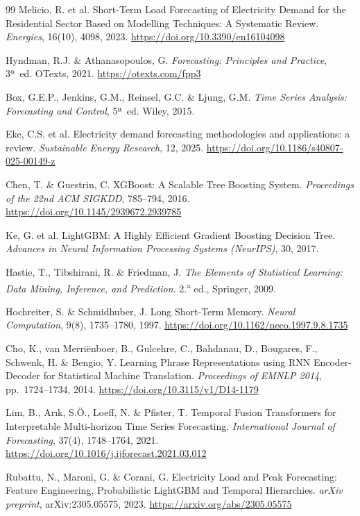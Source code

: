 \documentclass[12pt, a4paper]{article}
\begin{document}
\begin{thebibliography}{99}
Melicio, R. et al. Short-Term Load Forecasting of Electricity Demand for the Residential Sector Based on Modelling Techniques: A Systematic Review. \textit{Energies}, 16(10), 4098, 2023.
\url{https://doi.org/10.3390/en16104098}

Hyndman, R.J. \& Athanasopoulos, G. \textit{Forecasting: Principles and Practice}, 3ª~ed. OTexts, 2021.
\url{https://otexts.com/fpp3}

Box, G.E.P., Jenkins, G.M., Reinsel, G.C. \& Ljung, G.M. \textit{Time Series Analysis: Forecasting and Control}, 5ª~ed. Wiley, 2015.

Eke, C.S. et al. Electricity demand forecasting methodologies and applications: a review. \textit{Sustainable Energy Research}, 12, 2025.
\url{https://doi.org/10.1186/s40807-025-00149-z}

Chen, T. \& Guestrin, C. XGBoost: A Scalable Tree Boosting System. \textit{Proceedings of the 22nd ACM SIGKDD}, 785--794, 2016.
\url{https://doi.org/10.1145/2939672.2939785}

Ke, G. et al. LightGBM: A Highly Efficient Gradient Boosting Decision Tree. \textit{Advances in Neural Information Processing Systems (NeurIPS)}, 30, 2017.

Hastie, T., Tibshirani, R. \& Friedman, J. \textit{The Elements of Statistical Learning: Data Mining, Inference, and Prediction}. 2.\textsuperscript{a} ed., Springer, 2009.

Hochreiter, S. \& Schmidhuber, J. Long Short-Term Memory. \textit{Neural Computation}, 9(8), 1735--1780, 1997.
\url{https://doi.org/10.1162/neco.1997.9.8.1735}

Cho, K., van Merriënboer, B., Gulcehre, C., Bahdanau, D., Bougares, F., Schwenk, H. \& Bengio, Y. Learning Phrase Representations using RNN Encoder-Decoder for Statistical Machine Translation. \textit{Proceedings of EMNLP 2014}, pp.~1724--1734, 2014.
\url{https://doi.org/10.3115/v1/D14-1179}

Lim, B., Arık, S.Ö., Loeff, N. \& Pfister, T. Temporal Fusion Transformers for Interpretable Multi-horizon Time Series Forecasting. \textit{International Journal of Forecasting}, 37(4), 1748--1764, 2021.
\url{https://doi.org/10.1016/j.ijforecast.2021.03.012}

Rubattu, N., Maroni, G. \& Corani, G. Electricity Load and Peak Forecasting: Feature Engineering, Probabilistic LightGBM and Temporal Hierarchies. \textit{arXiv preprint}, arXiv:2305.05575, 2023.
\url{https://arxiv.org/abs/2305.05575}


\end{thebibliography}
\end{document}
